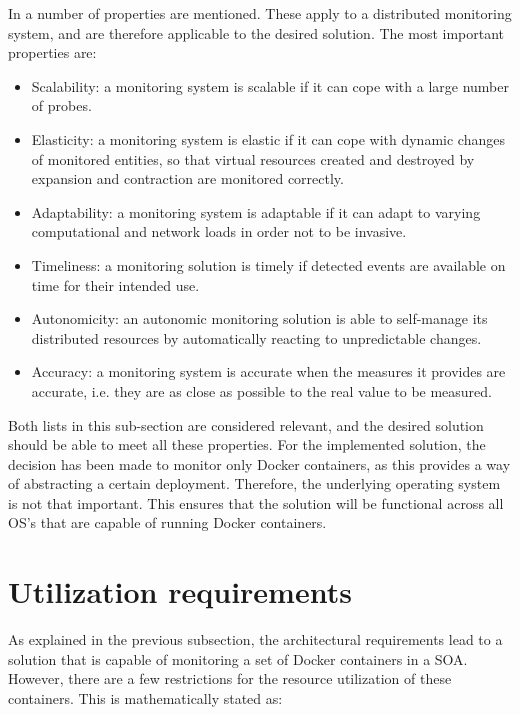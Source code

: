 In \cite{aceto2013cloud} a number of properties are mentioned. These apply to a distributed monitoring system, and are therefore applicable to the desired solution. The most important properties are:
\begin{itemize}
    \item Scalability: a monitoring system is scalable if it can cope with a large number of probes.
    \item Elasticity: a monitoring system is elastic if it can cope with dynamic changes of monitored entities, so that virtual resources created and destroyed by expansion and contraction are monitored correctly.
    \item Adaptability: a monitoring system is adaptable if it can adapt to varying computational and network loads in order not to be invasive.
    \item Timeliness: a monitoring solution is timely if detected events are available on time for their intended use.
    \item Autonomicity: an autonomic monitoring solution is able to self-manage its distributed resources by automatically reacting to unpredictable changes.
    \item Accuracy: a monitoring system is accurate when the measures it provides are accurate, i.e. they are as close as possible to the real value to be measured.
\end{itemize}

Both lists in this sub-section are considered relevant, and the desired solution should be able to meet all these properties. For the implemented solution, the decision has been made to monitor only Docker containers, as this provides a way of abstracting a certain deployment. Therefore, the underlying operating system is not that important. This ensures that the solution will be functional across all OS's that are capable of running Docker containers. 

\section{Utilization requirements} \label{sec:utilization}
As explained in the previous subsection, the architectural requirements lead to a solution that is capable of monitoring a set of Docker containers in a SOA. However, there are a few restrictions for the resource utilization of these containers. This is mathematically stated as:

